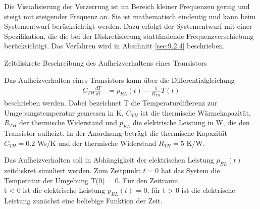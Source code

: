 Die Visualisierung der Verzerrung ist im Bereich kleiner Frequenzen gering und steigt mit steigender Frequenz an. Sie ist mathematisch eindeutig und kann beim Systementwurf berücksichtigt werden. Dazu erfolgt der Systementwurf mit einer Spezifikation, die die bei der Diskretisierung stattfindende Frequenzverschiebung berücksichtigt. Das Verfahren wird in Abschnitt \ref{sec:9.2.4} beschrieben.

\begin{example}{Zeitdiskrete Beschreibung des Aufheizverhaltens eines Transistors}
\label{example:beispiel-zeitdiskrete-beschreibung-des-aufheizverhaltens-eines-transistors}

Das Aufheizverhalten eines Transistors kann über die Differentialgleichung
\begin{align*}
C_{TH}  \frac{dT}{dt} &= p_{EL}(t) - \frac{1}{R_{TH}}  T(t) 
\end{align*}
beschrieben werden. Dabei bezeichnet T die Temperaturdifferenz zur Umgebungstemperatur gemessen in K, \(C_{TH}\) ist die thermische Wärmekapazität, \(R_{TH}\) der thermische Widerstand und \(p_{EL}\) die elektrische Leistung in W, die den Transistor aufheizt. In der Anordnung beträgt die thermische Kapazität\\
\(C_{TH} = 0.2\) Ws/K und der thermische Widerstand \(R_{TH} = 5\) K/W.

Das Aufheizverhalten soll in Abhängigkeit der elektrischen Leistung \(p_{EL}(t)\) zeitdiskret simuliert werden. Zum Zeitpunkt \(t = 0\) hat das System die Temperatur der Umgebung T(0) = 0. Für den Zeitraum\\
t \textless{} 0 ist die elektrische Leistung \(p_{EL}(t)\) = 0, für t \textgreater{} 0 ist die elektrische Leistung zunächst eine beliebige Funktion der Zeit.


\end{example}
